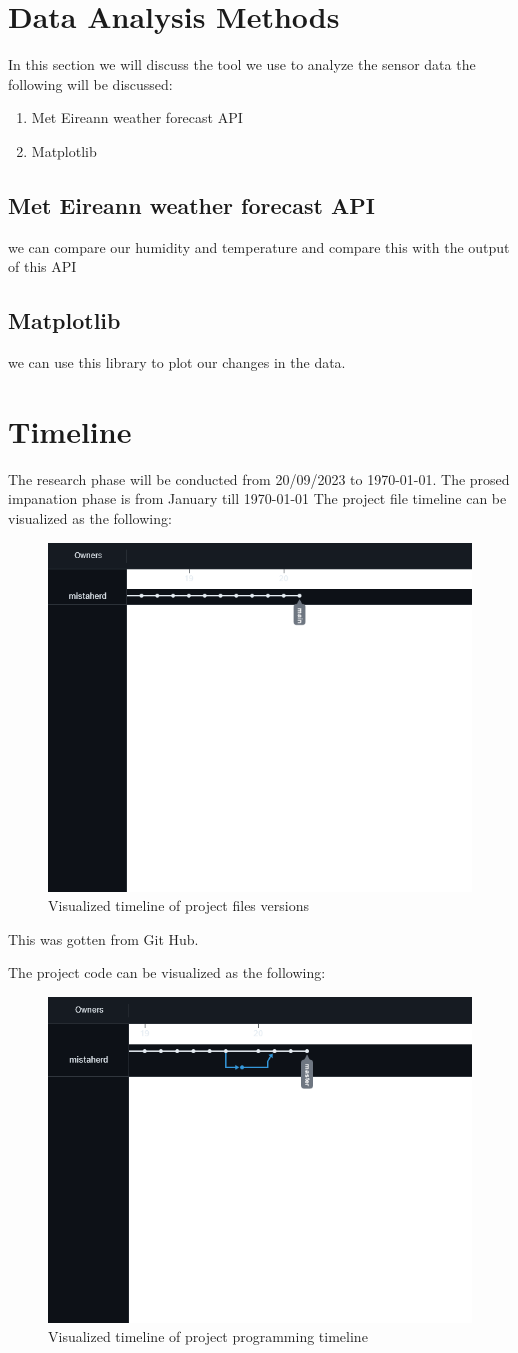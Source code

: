 \section{Data Analysis Methods}
In this section we will discuss the tool we use to analyze the sensor data the following will be discussed:
\begin{enumerate}
    \item Met Eireann weather forecast API
    \item Matplotlib
\end{enumerate}
\subsection{Met Eireann weather forecast API}
we can compare our humidity and temperature and compare this with the output of this  API
\subsection{Matplotlib}
we can use this library to plot our changes in the data.

\newpage
\section{Timeline}
The research phase will be conducted from 20/09/2023 to \today. The prosed impanation phase is from January till \today
The project file timeline can be visualized as  the following:
\begin{figure}[h!]
    \centering
    \includegraphics[width=0.5\linewidth]{Images/timeline_of_file.png}
    \caption{Visualized timeline of project files versions}
    \label{Visualized timeline of project files versions}
\end{figure}

This was gotten from Git Hub.

The  project code can be visualized as the following:
\begin{figure}[h!]
    \centering
    \includegraphics[width=0.5\linewidth]{Images/timeline_of_code.png}
    \caption{Visualized timeline of project programming timeline}
    \label{Visualized timeline of project programming timeline}
\end{figure}